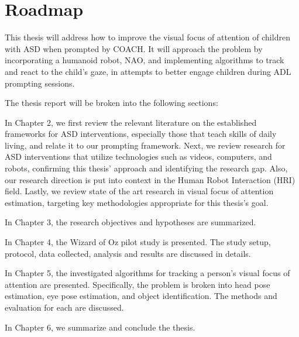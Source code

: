 \section{Roadmap}

This thesis will address how to improve the visual focus of attention of children with ASD when prompted by COACH.  It will approach the problem by incorporating a humanoid robot, NAO, and implementing algorithms to track and react to the child's gaze, in attempts to better engage children during ADL prompting sessions.


The thesis report will be broken into the following sections:


In Chapter 2, we first review the relevant literature on the established frameworks for ASD interventions, especially those that teach skills of daily living, and relate it to our prompting framework.  Next, we review research for ASD interventions that utilize technologies such as videos, computers, and robots, confirming this thesis' approach and identifying the research gap.  Also, our research direction is put into context in the Human Robot Interaction (HRI) field.  Lastly, we review state of the art research in visual focus of attention estimation, targeting key methodologies appropriate for this thesis's goal.


In Chapter 3, the research objectives and hypotheses are summarized.

In Chapter 4, the Wizard of Oz pilot study is presented.  The study setup, protocol, data collected, analysis and results are discussed in details.

In Chapter 5, the investigated algorithms for tracking a person's visual focus of attention are presented.  Specifically, the problem is broken into head pose estimation, eye pose estimation, and object identification.  The methods and evaluation for each are discussed.

In Chapter 6, we summarize and conclude the thesis.


